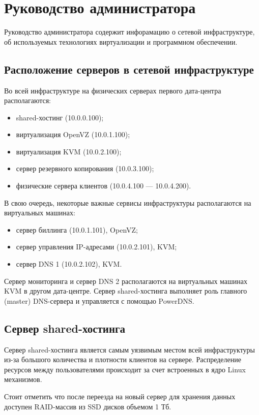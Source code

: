 \section{Руководство администратора}

Руководство администратора содержит инфорамацию о сетевой инфраструктуре, об используемых технологиях виртуализации и программном обеспечении.

\subsection{Расположение серверов в сетевой инфраструктуре}
Во всей инфраструктуре на физических серверах первого дата-центра располагаются:
\begin{itemize}
  \item shared-хостинг (10.0.0.100);
  \item виртуализация OpenVZ (10.0.1.100);
  \item виртуализация KVM (10.0.2.100);
  \item сервер резервного копирования (10.0.3.100);
  \item физические сервера клиентов (10.0.4.100 --- 10.0.4.200).
\end{itemize}

В свою очередь, некоторые важные сервисы инфраструктуры располагаются на виртуальных машинах:
\begin{itemize}
  \item сервер биллинга (10.0.1.101), OpenVZ;
  \item сервер управления IP-адресами (10.0.2.101), KVM;
  \item сервер DNS 1 (10.0.2.102), KVM.
\end{itemize}

Сервер мониторинга и сервер DNS 2 располагаются на виртуальных машинах KVM в другом дата-центре.
Сервер shared-хостинга выполняет роль главного (master) DNS-сервера и управляется с помощью PowerDNS.

\subsection{Сервер shared-хостинга}

Сервер shared-хостинга является самым уязвимым местом всей инфраструктуры из-за большого количества и плотности клиентов на сервере.
Распределение ресурсов между пользователями происходит за счет встроенных в ядро Linux механизмов.

Стоит отметить что после переезда на новый сервер для хранения данных доступен RAID-массив из SSD дисков объемом 1 Тб.

